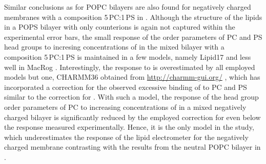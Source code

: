 Similar conclusions as for POPC bilayers are also found for 
negatively charged membranes with a composition 5\,PC:1\,PS in \citep{nmrlipids_proj4}. 
Although the structure of the lipids in a POPS bilayer with only  counterions
is again not captured within the experimental error bars,
the small response of the order parameters of PC and PS head groups 
to incresing concentrations of  in the mixed bilayer with a composition 5\,PC:1\,PS 
is maintained in a few models, 
namely Lipid17 \citep{lipid17-future} and less well in MacRog \citep{maciejewski14}. 
Interestingly, the response to  is overestimated by all employed models but one, CHARMM36 obtained from \url{http://charmm-gui.org/} \citep{jo08, lee15},
which has incorporated a correction for the observed excessive binding of  to PC and PS similar to the correction for  \citep{venable13}. 
With such a model, the response of the head group order parameters of PC 
to increasing concentrations of  in a mixed negatively charged bilayer
is significantly reduced by the employed correction for 
even below the response measured experimentally. 
Hence, it is the only model in the study,
which underestimates the response of the lipid electrometer for the negatively charged membrane
contrasting with the results from the neutral POPC bilayer in \citep{catte16}. 



